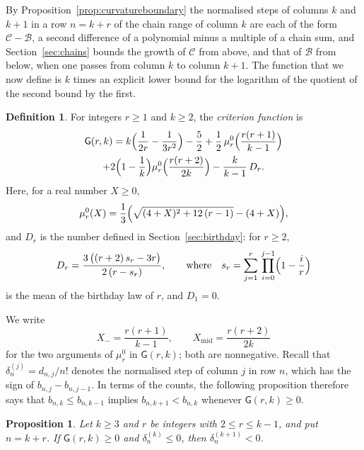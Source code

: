 \documentclass{amsart}
\newtheorem{proposition}[theorem]{Proposition}
\theoremstyle{definition}
\newtheorem{definition}[theorem]{Definition}
\theoremstyle{remark}
\numberwithin{equation}{section}
\begin{document}
By Proposition~\ref{prop:curvatureboundary} the normalised steps of columns $k$ and $k+1$ in a row $n=k+r$ of the chain range of column $k$ are each of the form $\mathcal C-\mathcal B$, a second difference of a polynomial minus a multiple of a chain sum, and Section~\ref{sec:chains} bounds the growth of $\mathcal C$ from above, and that of $\mathcal B$ from below, when one passes from column $k$ to column $k+1$. The function that we now define is $k$ times an explicit lower bound for the logarithm of the quotient of the second bound by the first.

\begin{definition}\label{def:criterionfunction}
For integers $r\ge 1$ and $k\ge 2$, the \emph{criterion function} is
\begin{multline*}
\mathsf G(r,k)=k\Bigl(\frac{1}{2r}-\frac{1}{3r^2}\Bigr)-\frac52+\frac12\,\mu^0_r\Bigl(\frac{r(r+1)}{k-1}\Bigr)\\
+2\Bigl(1-\frac1k\Bigr)\mu^0_r\Bigl(\frac{r(r+2)}{2k}\Bigr)-\frac{k}{k-1}\,D_r .
\end{multline*}
Here, for a real number $X\ge 0$,
\[
\mu^0_r(X)=\frac13\Bigl(\sqrt{(4+X)^2+12\,(r-1)}-(4+X)\Bigr),
\]
and $D_r$ is the number defined in Section~\ref{sec:birthday}: for $r\ge 2$,
\[
D_r=\frac{3\,\bigl((r+2)\,s_r-3r\bigr)}{2\,(r-s_r)},\qquad\text{where}\quad s_r=\sum_{j=1}^{r}\,\prod_{i=0}^{j-1}\Bigl(1-\frac ir\Bigr)
\]
is the mean of the birthday law of $r$, and $D_1=0$.
\end{definition}

We write
\[
X_-=\frac{r(r+1)}{k-1},\qquad X_{\mathrm{mid}}=\frac{r(r+2)}{2k}
\]
for the two arguments of $\mu^0_r$ in $\mathsf G(r,k)$; both are nonnegative. Recall that $\delta^{(j)}_n=d_{n,j}/n!$ denotes the normalised step of column $j$ in row $n$, which has the sign of $b_{n,j}-b_{n,j-1}$. In terms of the counts, the following proposition therefore says that $b_{n,k}\le b_{n,k-1}$ implies $b_{n,k+1}<b_{n,k}$ whenever $\mathsf G(r,k)\ge 0$.

\begin{proposition}\label{prop:nextcriterion}
Let $k\ge 3$ and $r$ be integers with $2\le r\le k-1$, and put $n=k+r$. If $\mathsf G(r,k)\ge 0$ and $\delta^{(k)}_n\le 0$, then $\delta^{(k+1)}_n<0$.
\end{proposition}
\end{document}
